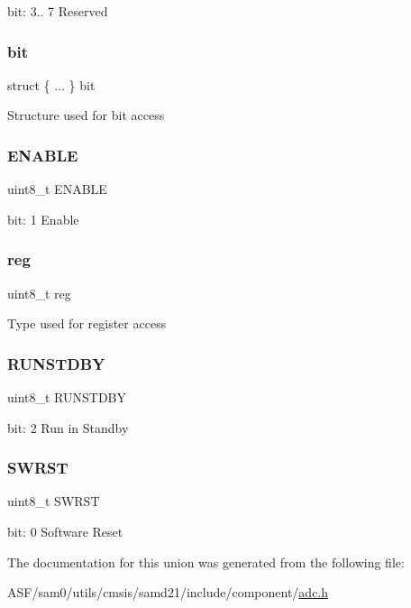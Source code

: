 bit\+: 3.. 7 Reserved \mbox{\label{union_a_d_c___c_t_r_l_a___type_a974213afa070a0905d94d04b172b6054}} 
\subsubsection{\texorpdfstring{bit}{bit}}
{\footnotesize\ttfamily struct \{ ... \}   bit}

Structure used for bit access \mbox{\label{union_a_d_c___c_t_r_l_a___type_a2b3662f1b123463ae1a23c1f324e5cc5}} 
\subsubsection{\texorpdfstring{ENABLE}{ENABLE}}
{\footnotesize\ttfamily uint8\+\_\+t E\+N\+A\+B\+LE}

bit\+: 1 Enable \mbox{\label{union_a_d_c___c_t_r_l_a___type_a9428adc9af4653a2050e2536b55dec8d}} 
\subsubsection{\texorpdfstring{reg}{reg}}
{\footnotesize\ttfamily uint8\+\_\+t reg}

Type used for register access \mbox{\label{union_a_d_c___c_t_r_l_a___type_aa24338c5cacc63e3b77adf2dc0938ff6}} 
\subsubsection{\texorpdfstring{RUNSTDBY}{RUNSTDBY}}
{\footnotesize\ttfamily uint8\+\_\+t R\+U\+N\+S\+T\+D\+BY}

bit\+: 2 Run in Standby \mbox{\label{union_a_d_c___c_t_r_l_a___type_a9334d5ac0548802c90a8129c52c8e490}} 
\subsubsection{\texorpdfstring{SWRST}{SWRST}}
{\footnotesize\ttfamily uint8\+\_\+t S\+W\+R\+ST}

bit\+: 0 Software Reset 

The documentation for this union was generated from the following file\+:\begin{DoxyCompactItemize}
\item 
A\+S\+F/sam0/utils/cmsis/samd21/include/component/\mbox{\hyperlink{component_2adc_8h}{adc.\+h}}\end{DoxyCompactItemize}
